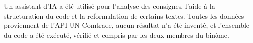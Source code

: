 \documentclass[11pt,a4paper]{article}
\begin{document}
Un assistant d'IA a été utilisé pour l'analyse des consignes, l'aide à la structuration du code et la reformulation de certains textes. Toutes les données proviennent de l'API UN Comtrade, aucun résultat n'a été inventé, et l'ensemble du code a été exécuté, vérifié et compris par les deux membres du binôme.
\end{document}
